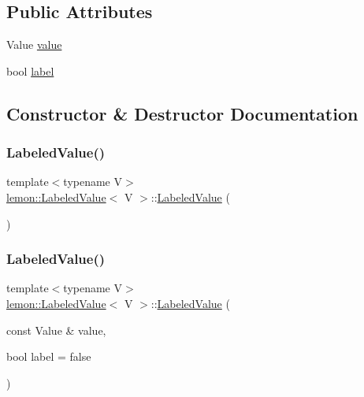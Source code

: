 \subsection*{Public Attributes}
\begin{DoxyCompactItemize}
\item 
Value \hyperlink{classlemon_1_1_labeled_value_ad52008450e02d6f966a512f45cccd695}{value}
\item 
bool \hyperlink{classlemon_1_1_labeled_value_a2e6cbc625abb719205f698a1ee605f34}{label}
\end{DoxyCompactItemize}


\subsection{Constructor \& Destructor Documentation}
\mbox{\label{classlemon_1_1_labeled_value_a14eecff046442f7d6ddca93014e95b05}} 
\subsubsection{\texorpdfstring{Labeled\+Value()}{LabeledValue()}\hspace{0.1cm}{\footnotesize\ttfamily [1/3]}}
{\footnotesize\ttfamily template$<$typename V$>$ \\
\hyperlink{classlemon_1_1_labeled_value}{lemon\+::\+Labeled\+Value}$<$ V $>$\+::\hyperlink{classlemon_1_1_labeled_value}{Labeled\+Value} (\begin{DoxyParamCaption}{ }\end{DoxyParamCaption})\hspace{0.3cm}{\ttfamily [inline]}}

\mbox{\label{classlemon_1_1_labeled_value_a95f29b1d3308d805fa51a13790cd08f0}} 
\subsubsection{\texorpdfstring{Labeled\+Value()}{LabeledValue()}\hspace{0.1cm}{\footnotesize\ttfamily [2/3]}}
{\footnotesize\ttfamily template$<$typename V$>$ \\
\hyperlink{classlemon_1_1_labeled_value}{lemon\+::\+Labeled\+Value}$<$ V $>$\+::\hyperlink{classlemon_1_1_labeled_value}{Labeled\+Value} (\begin{DoxyParamCaption}\item[{const Value \&}]{value,  }\item[{bool}]{label = {\ttfamily false} }\end{DoxyParamCaption})\hspace{0.3cm}{\ttfamily [inline]}}

